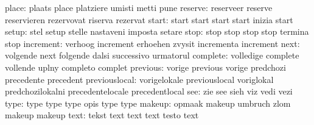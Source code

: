                     place: plaats                    place
                           platziere                 umisti
                           metti                     pune
                  reserve: reserveer                 reserve
                           reservieren               rezervovat
                           riserva                   rezervat
                    start: start                     start
                           start                     start
                           inizia                    start
                    setup: stel                      setup
                           stelle                    nastaveni
                           imposta                   setare
                     stop: stop                      stop
                           stop                      stop
                           termina                   stop
                increment: verhoog                   increment
                           erhoehen                  zvysit
                           incrementa                increment
                     next: volgende                  next
                           folgende                  dalsi
                           successivo                urmatorul
                 complete: volledige                 complete
                           vollende                  uplny
                           completo                  complet
                 previous: vorige                    previous
                           vorige                    predchozi
                           precedente                precedent
            previouslocal: vorigelokale              previouslocal
                           voriglokal                predchozilokalni
                           precedentelocale          precedentlocal
                      see: zie                       see
                           sieh                      viz
                           vedi                      vezi
                     type: type                      type
                           type                      opis
                           type                      type %
                   makeup: opmaak                    makeup
                           umbruch                   zlom
                           makeup                    makeup %
                     text: tekst                     text
                           text                      text
                           testo                     text

\stopelements

